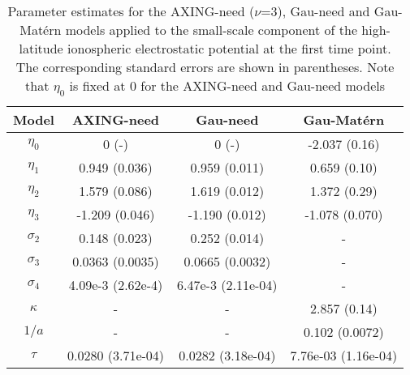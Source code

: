 \documentclass[aoas,preprint]{imsart}
\numberwithin{equation}{section}
\theoremstyle{plain}
\begin{document}
\begin{table}[htp]
\caption{Parameter estimates for the AXING-need ($\nu$=3), Gau-need and Gau-Mat\'ern models applied to the small-scale component of the high-latitude ionospheric electrostatic potential at the first time point. The corresponding standard errors are shown in parentheses. Note that $\eta_0$ is fixed at $0$ for the AXING-need and Gau-need models}
\begin{center}
\begin{tabular}{cccc}
\hline
\hline
Model & AXING-need & Gau-need & Gau-Mat\'ern \\
\hline
$\eta_0$ & 0 (-) & 0 (-) & -2.037 (0.16) \\
$\eta_1$ & 0.949 (0.036) & 0.959 (0.011) & 0.659 (0.10) \\
$\eta_2$ & 1.579 (0.086) & 1.619 (0.012) & 1.372 (0.29) \\
$\eta_3$ & -1.209 (0.046) & -1.190 (0.012) & -1.078 (0.070) \\
$\sigma_2$ & 0.148 (0.023) & 0.252 (0.014) & -\\
$\sigma_3$ & 0.0363 (0.0035) & 0.0665 (0.0032) & - \\
$\sigma_4$ & 4.09e-3 (2.62e-4) & 6.47e-3 (2.11e-04) & -\\
$\kappa$ & - & - & 2.857 (0.14) \\
$1/a$ & - & - & 0.102 (0.0072) \\
$\tau$ & 0.0280 (3.71e-04) & 0.0282 (3.18e-04) & 7.76e-03 (1.16e-04) \\
\hline
\end{tabular}
\end{center}
\label{table:fitted_param}
\end{table}%
\end{document}
